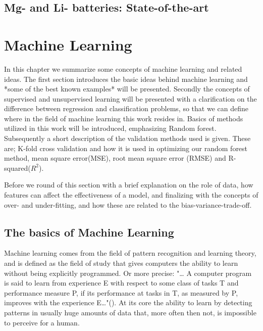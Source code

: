 \subsection{Mg- and Li- batteries: State-of-the-art}
	
	
	
\pagebreak
\section{Machine Learning}

In this chapter we summarize some concepts of machine learning and related ideas. The first section introduces the basic ideas behind machine learning and *some of the best known examples* will be presented. Secondly the concepts of supervised and unsupervised learning will be presented with a clarification on the difference between regression and classification problems, so that we can define where in the field of machine learning this work resides in. Basics of methods utilized in this work will be introduced, emphasizing Random forest. Subsequently a short description of the validation methods used is given. These are; K-fold cross validation and how it is used in optimizing our random forest method, mean square error(MSE), root mean square error (RMSE) and R-squared($R^2$). 
   
Before we round of this section with a brief explanation on the role of data, how features can affect the effectiveness of a model, and finalizing with the concepts of over- and under-fitting, and how these are related to the bias-variance-trade-off. 




\subsection{The basics of Machine Learning}

Machine learning comes from the field of pattern recognition and learning theory, and is defined as the field of study that gives computers the ability to learn without being explicitly programmed. Or more precise: "… A computer program is said to learn from experience E with respect to some class of tasks T and performance measure P, if its performance at tasks in T, as measured by P, improves with the experience E…"(\cite{mitchell1997machine}). At its core the ability to learn by detecting patterns in usually huge amounts of data that, more often then not, is impossible to perceive for a human. 


